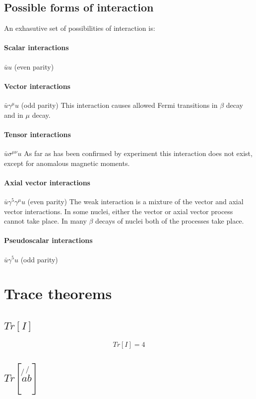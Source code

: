 \subsection{Possible forms of interaction}

An exhasutive set of possibilities of interaction is:

\paragraph*{Scalar interactions} $\bar{u}u$ (even parity)
\paragraph*{Vector interactions} $\bar{u}\gamma^{\mu}u$ (odd parity)  This interaction causes allowed Fermi transitions in $\beta$ decay and in $\mu$ decay.  
\paragraph*{Tensor interactions} $\bar{u}\sigma^{\mu\nu}u$  As far as has been confirmed by experiment this interaction does not exist, except for anomalous magnetic moments.
\paragraph*{Axial vector interactions} $\bar{u}\gamma^5\gamma^{\mu}u$ (even parity)  The weak interaction is a mixture of the vector and axial vector interactions.  In some nuclei, either the vector or axial vector process cannot take place.  In many $\beta$ decays of nuclei both of the processes take place.
\paragraph*{Pseudoscalar interactions} $\bar{u}\gamma^5u$ (odd parity)

\section{Trace theorems}

\subsection{\texorpdfstring{$Tr[I]$}{TrI}}

\[
  Tr[I] = 4
\]

\subsection{\texorpdfstring{$Tr[\not{a}\not{b}]$}{TrNotANotB}}

